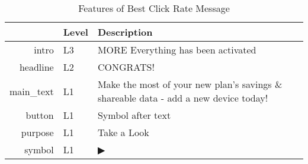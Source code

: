 \begin{table}[ht]
\centering
\caption{Features of Best Click Rate Message} 
\label{tab:best_click}
\begin{tabular}{rll}
  \hline
 & Level & Description \\ 
  \hline
intro & L3 & MORE Everything has been activated \\ 
  headline & L2 & CONGRATS! \\ 
  main\_text & L1 & Make the most of your new plan’s savings \& shareable data - add a new device today! \\ 
  button & L1 & Symbol after text \\ 
  purpose & L1 & Take a Look \\ 
  symbol & L1 & ▶ \\ 
   \hline
\end{tabular}
\end{table}
